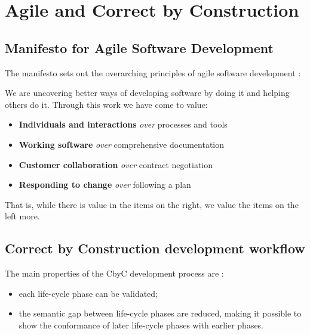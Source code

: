 
\chapter{Agile and Correct by Construction} %

\label{Chapter 2} %

\section{Manifesto for Agile Software Development}

The manifesto sets out the overarching principles of agile software development \parencite{Beck2001ManifestoFA}:

\begin{displayquote}
We are uncovering better ways of developing software by doing it and helping 
others do it. Through this work we have come to value:

\begin{itemize}
	\item \textbf{Individuals and interactions} \textit{over} processes and tools 
	\item \textbf{Working software} \textit{over} comprehensive documentation 
	\item \textbf{Customer collaboration} \textit{over} contract negotiation 
	\item \textbf{Responding to change} \textit{over} following a plan 
\end{itemize}

That is, while there is value in the items on the right, we value the items on
the left more.
\end{displayquote}

\section{Correct by Construction development workflow}

The main properties of the CbyC development process are  \parencite{Tokeneer}:
\begin{itemize}
	\item each life-cycle phase can be validated;
	\item the semantic gap between life-cycle phases are reduced, making it possible
		to show the conformance of later life-cycle phases with earlier phases.
\end{itemize}

